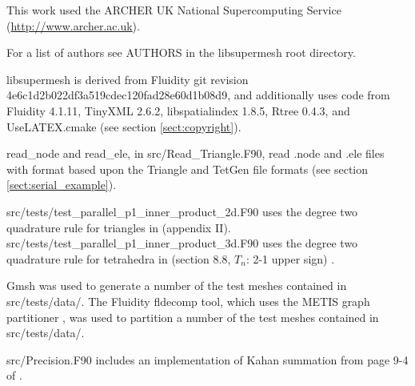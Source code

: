 \documentclass{article}
\begin{document}
This work used the ARCHER UK National Supercomputing Service
(\url{http://www.archer.ac.uk}).

For a list of authors see AUTHORS in the libsupermesh root directory.

libsupermesh is derived from Fluidity git revision
4e6c1d2b022df3a519cdec120fad28e60d1b08d9, and additionally uses code from
Fluidity 4.1.11, TinyXML 2.6.2, libspatialindex 1.8.5, Rtree 0.4.3, and
UseLATEX.cmake (see section \ref{sect:copyright}).

read\_node and read\_ele, in src/Read\_Triangle.F90, read .node and .ele files
with format based upon the Triangle and TetGen file formats (see section
\ref{sect:serial_example}).

src/tests/test\_parallel\_p1\_inner\_product\_2d.F90 uses the degree two
quadrature rule for triangles in \citet{dunavant1985} (appendix II).
src/tests/test\_parallel\_p1\_inner\_product\_3d.F90 uses the degree two
quadrature rule for tetrahedra in
\citet{stroud1971} (section 8.8, $T_n$: 2-1 upper sign)
\citep[see also][]{hammer1956}.

Gmsh \citep{geuzaine2009} was used to generate a number of the test meshes
contained in src/tests/data/. The Fluidity fldecomp tool, which uses the METIS
graph partitioner \citep{karypis1998}, was used to partition a number of the
test meshes contained in src/tests/data/.

src/Precision.F90 includes an implementation of Kahan summation from page 9-4
of \citet{kahan1973} \citep[see also][]{kahan1965,higham1993}.



\end{document}
